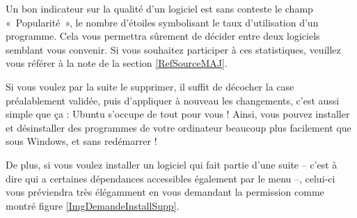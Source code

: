 {\begin{nota}
Un bon indicateur sur la qualité d'un logiciel est sans conteste le champ «~Popularité~», le nombre d'étoiles symbolisant le taux d'utilisation d'un programme. Cela vous permettra sûrement de décider entre deux logiciels semblant vous convenir. Si vous souhaitez participer à ces statistiques, veuillez vous référer à la note de la section \ref{RefSourceMAJ}.
\end{nota}
Si vous voulez par la suite le supprimer, il suffit de décocher la case préalablement validée, puis d'appliquer à nouveau les changements, c'est aussi simple que ça : Ubuntu s'occupe de tout pour vous ! Ainsi, vous pouvez installer et désinstaller des programmes de votre ordinateur beaucoup plus facilement que sous Windows, et sans redémarrer !\par
De plus, si vous voulez installer un logiciel qui fait partie d'une suite -- c'est à dire qui a certaines dépendances accessibles également par le menu --, celui-ci vous préviendra très élégamment en vous demandant la permission comme montré figure \ref{ImgDemandeInstallSupp}.
}
